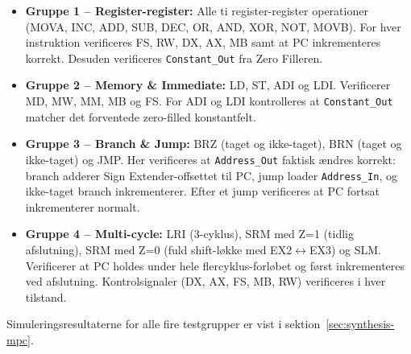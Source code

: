 \documentclass{article}
\begin{document}
\begin{itemize}
    \item \textbf{Gruppe 1 -- Register-register:} Alle ti register-register operationer (MOVA, INC, ADD, SUB, DEC, OR, AND, XOR, NOT, MOVB). For hver instruktion verificeres FS, RW, DX, AX, MB samt at PC inkrementeres korrekt. Desuden verificeres \texttt{Constant\_Out} fra Zero Filleren.

    \item \textbf{Gruppe 2 -- Memory \& Immediate:} LD, ST, ADI og LDI. Verificerer MD, MW, MM, MB og FS. For ADI og LDI kontrolleres at \texttt{Constant\_Out} matcher det forventede zero-filled konstantfelt.

    \item \textbf{Gruppe 3 -- Branch \& Jump:} BRZ (taget og ikke-taget), BRN (taget og ikke-taget) og JMP. Her verificeres at \texttt{Address\_Out} faktisk ændres korrekt: branch adderer Sign Extender-offsettet til PC, jump loader \texttt{Address\_In}, og ikke-taget branch inkrementerer. Efter et jump verificeres at PC fortsat inkrementerer normalt.

    \item \textbf{Gruppe 4 -- Multi-cycle:} LRI (3-cyklus), SRM med Z=1 (tidlig afslutning), SRM med Z=0 (fuld shift-løkke med EX2$\leftrightarrow$EX3) og SLM. Verificerer at PC holdes under hele flercyklus-forløbet og først inkrementeres ved afslutning. Kontrolsignaler (DX, AX, FS, MB, RW) verificeres i hver tilstand.
\end{itemize}

\noindent Simuleringsresultaterne for alle fire testgrupper er vist i sektion~\ref{sec:synthesis-mpc}.

\ifdefined\mainfile\else
\end{document}
